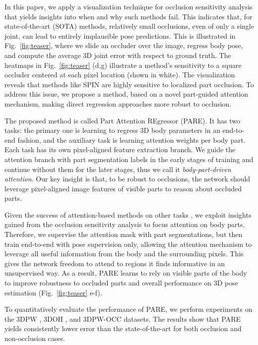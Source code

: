 \documentclass[10pt,twocolumn,letterpaper,usenames,dvipsnames]{article}
\newcommand{\methodname}{PARE\xspace}
\newcommand{\figref}[1]{Fig.~\ref{#1}}
\begin{document}
In this paper, we apply a visualization technique \cite{zeiler2014visualizing} for occlusion sensitivity analysis that
yields insights into when and why such methods fail. 
This indicates that, for state-of-the-art (SOTA) methods, relatively small occlusions, even of only a single joint, can lead to entirely implausible pose predictions. 
This is illustrated in \figref{fig:teaser}, where we slide an occluder over the image, regress body pose, and compute the average 3D joint error with respect to ground truth.
The heatmaps in \figref{fig:teaser} (d,g) illustrate a method's sensitivity to a square occluder centered at each pixel location (shown in white). 
The visualization reveals that methods like SPIN \cite{pavlakos2018humanshape} are highly sensitive to localized part occlusion.
To address this issue, we propose a method, based on a novel part-guided attention mechanism, making direct regression approaches more robust to occlusion.

The proposed method is called Part Attention REgressor (\methodname). It has two tasks: the primary one is learning to regress 3D body parameters in an end-to-end fashion, and the auxiliary task is learning attention weights per body part. Each task has its own pixel-aligned feature extraction branch. We guide the attention branch with part segmentation labels in the early stages of training and continue without them for the later stages, thus we call it \emph{body-part-driven attention}.
Our key insight is that, to be robust to occlusions, the network should leverage pixel-aligned image features of visible parts to reason about occluded parts.

Given the success of attention-based methods on other tasks \cite{expose2020eccv,epipolartransformers2020cvpr,Lu_2019_CVPR,Wang_2018_CVPR}, we exploit insights gained from the occlusion sensitivity analysis to focus attention on body parts. Therefore, we supervise the attention mask with part segmentations, but then train end-to-end with pose supervision only, allowing the attention mechanism to leverage all useful information from the body and the surrounding pixels. This gives the network freedom to attend to regions it finds informative in an unsupervised way. As a result, {\methodname} learns to rely on visible parts of the body to improve robustness to occluded parts and overall performance on 3D pose estimation (\figref{fig:teaser} e-f).

To quantitatively evaluate the performance of {\methodname}, we perform experiments on the 3DPW \cite{vonMarcard2018_3dpw}, 3DOH \cite{zhangoohcvpr20}, and 3DPW-OCC \cite{vonMarcard2018_3dpw} datasets.
The results show that {\methodname} yields consistently lower error than the state-of-the-art for both occlusion and non-occlusion cases.
\end{document}
